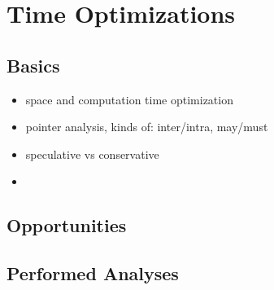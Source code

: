 \section{Time Optimizations}
\subsection{Basics}
\begin{itemize}
\item space and computation time optimization
\item pointer analysis, kinds of: inter/intra, may/must
\item speculative vs conservative
\item 
\end{itemize}
\subsection{Opportunities}
\subsection{Performed Analyses}